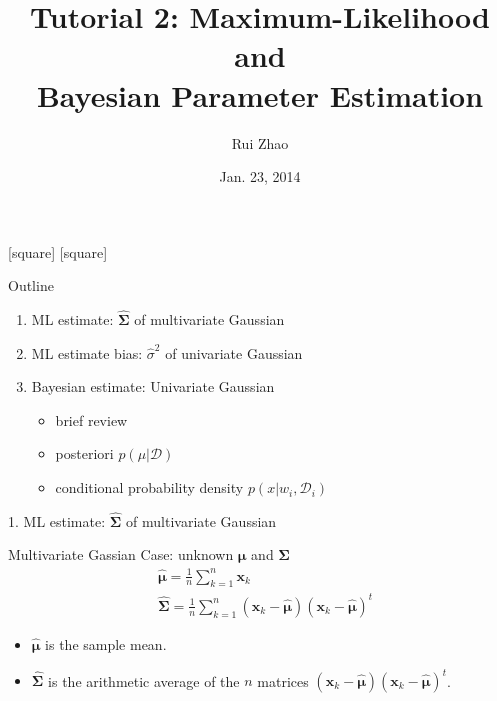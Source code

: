 \documentclass[compress,blue]{beamer}
\title[ENGG 5202 Pattern Recogntion Tutorial 2]{Tutorial 2: Maximum-Likelihood and \\ Bayesian Parameter Estimation}
\author{Rui Zhao}
\institute{rzhao@ee.cuhk.edu.hk}
\date{Jan. 23, 2014}
\newcommand{\bx}{\mathbf{x}}
\newcommand{\bmu}{\mathbf{\mu}}
\newcommand{\bSig}{\mathbf{\Sigma}}
\newcommand{\calD}{\mathcal{D}}
\begin{document}
\begin{frame}
\titlepage
\end{frame}

[square]
[square]

\begin{frame}{Outline}
	\begin{enumerate}
		\item<1-2> ML estimate: $\hat{\bSig}$ of multivariate Gaussian 
		\vspace{0.1in}
		\item<1> ML estimate bias: $\hat{\sigma}^2$ of univariate Gaussian
		\vspace{0.1in}
		\item<1> Bayesian estimate: Univariate Gaussian
		\begin{itemize}
			\item brief review
			\item posteriori $p(\mu|\calD)$
			\item conditional probability density $p(x | w_i, \calD_i)$
		\end{itemize}
	\end{enumerate}
\end{frame}

\begin{frame}{1. ML estimate: $\hat{\bSig}$ of multivariate Gaussian }
	\begin{block}{Multivariate Gassian Case: unknown $\bmu$ and $\bSig$}
		\begin{align}
			&\hat{\bmu} = \frac{1}{n}\sum_{k=1}^n\bx_k\\
			&\hat{\bSig} = \frac{1}{n}\sum_{k=1}^n(\bx_k - \hat{\bmu})(\bx_k - \hat{\bmu})^t
		\end{align}
		\small
		\begin{itemize}
			\item $\hat{\bmu}$ is the sample mean. 
			\item $\hat{\bSig}$ is the arithmetic average of the $n$ matrices $(\bx_k - \hat{\bmu})(\bx_k - \hat{\bmu})^t$.
		\end{itemize}
		\normalsize
	\end{block}	
\end{frame}
\end{document}
